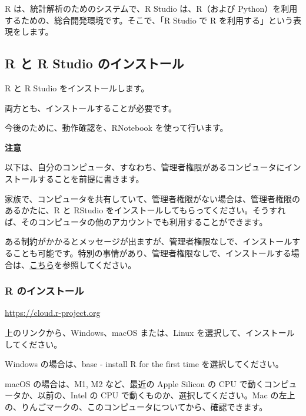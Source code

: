 \documentclass[
]{bxjsbook}
\theoremstyle{definition}
\theoremstyle{definition}
\theoremstyle{definition}
\theoremstyle{definition}
\theoremstyle{remark}
\begin{document}
R は、統計解析のためのシステムで、R Studio は、R（および Python）を利用するための、総合開発環境です。そこで、「R Studio で R を利用する」という表現をします。

\hypertarget{r-ux3068-r-studio-ux306eux30a4ux30f3ux30b9ux30c8ux30fcux30eb}{%
\subsection{R と R Studio のインストール}\label{r-ux3068-r-studio-ux306eux30a4ux30f3ux30b9ux30c8ux30fcux30eb}}

R と R Studio をインストールします。

両方とも、インストールすることが必要です。

今後のために、動作確認を、RNotebook を使って行います。

\textbf{注意}

以下は、自分のコンピュータ、すなわち、管理者権限があるコンピュータにインストールすることを前提に書きます。

家族で、コンピュータを共有していて、管理者権限がない場合は、管理者権限のあるかたに、R と RStudio をインストールしてもらってください。そうすれば、そのコンピュータの他のアカウントでも利用することができます。

ある制約がかかるとメッセージが出ますが、管理者権限なしで、インストールすることも可能です。特別の事情があり、管理者権限なしで、インストールする場合は、\href{https://icu-hsuzuki.github.io/myds/techmemo.html\#\%E9\%9D\%9E\%E7\%AE\%A1\%E7\%90\%86\%E8\%80\%85\%E3\%81\%A8\%E3\%81\%97\%E3\%81\%A6-r-\%E3\%81\%A8-rstudio-\%E3\%82\%92\%E3\%82\%A4\%E3\%83\%B3\%E3\%82\%B9\%E3\%83\%88\%E3\%83\%BC\%E3\%83\%AB}{こちら}を参照してください。

\hypertarget{r-ux306eux30a4ux30f3ux30b9ux30c8ux30fcux30eb}{%
\subsubsection{R のインストール}\label{r-ux306eux30a4ux30f3ux30b9ux30c8ux30fcux30eb}}

\url{https://cloud.r-project.org}

上のリンクから、Windows、macOS または、Linux を選択して、インストールしてください。

Windows の場合は、base - install R for the first time を選択してください。

macOS の場合は、M1, M2 など、最近の Apple Silicon の CPU で動くコンピュータか、以前の、Intel の CPU で動くものか、選択してください。Mac の左上の、りんごマークの、このコンピュータについてから、確認できます。
\end{document}
